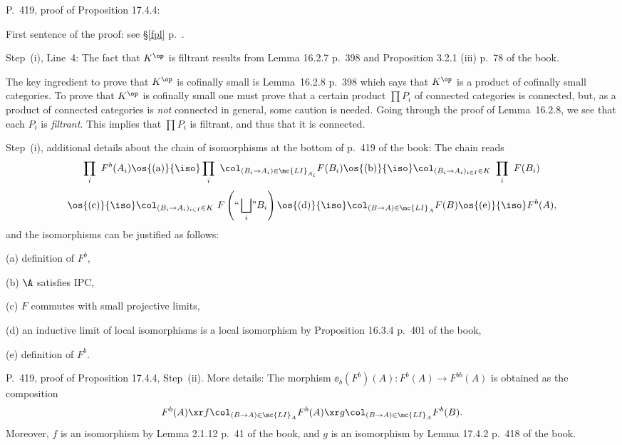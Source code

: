 \documentclass[12pt]{article}
\theoremstyle{remark}
\theoremstyle{definition}
\begin{document}
\begin{s}
P.~419, proof of Proposition 17.4.4: 

\nn First sentence of the proof: see \S\ref{fpl} p.~. 


\nn Step~(i), Line~4: The fact that $K^{\op}$ is filtrant results from Lemma 16.2.7 p.~398 and Proposition 3.2.1 (iii) p.~78 of the book. 

The key ingredient to prove that $K^{\op}$ is cofinally small is Lemma~16.2.8 p.~398 which says that $K^{\op}$ is a product of cofinally small categories. To prove that $K^{\op}$ is cofinally small one must prove that a certain product $\prod P_i$ of connected categories is connected, but, as a product of connected categories is \emph{not} connected in general, some caution is needed. Going through the proof of Lemma~16.2.8, we see that each $P_i$ is \emph{filtrant}. This implies that $\prod P_i$ is filtrant, and thus that it is connected.

\nn Step~(i), additional details about the chain of isomorphisms at the bottom of p.~419 of the book: The chain reads 
$$
\prod_i\ F^b(A_i)
\os{(\text a)}{\iso}\prod_i\ \col_{(B_i\to A_i)\in\mc{LI}_{A_i}}F(B_i)
\os{(\text b)}{\iso}\col_{(B_i\to A_i)_{i\in I}\in K}\ \prod_i\ F(B_i)
$$
$$
\os{(\text c)}{\iso}\col_{(B_i\to A_i)_{i\in I}\in K}\ F\left(``\bigsqcup_i\!"B_i\right)
\os{(\text d)}{\iso}\col_{(B\to A)\in\mc{LI}_A}F(B)
\os{(\text e)}{\iso}F^b(A), 
$$ 
and the isomorphisms can be justified as follows: 

\nn(a) definition of $F^b$, 

\nn(b) $\A$ satisfies IPC,

\nn(c) $F$ commutes with small projective limits, 

\nn(d) an inductive limit of local isomorphisms is a local isomorphism by Proposition 16.3.4 p.~401 of the book, 

\nn(e) definition of $F^b$. 
\end{s} 

%

\begin{s} 
P.~419, proof of Proposition 17.4.4, Step~(ii). More details: The morphism $\ee_b(F^b)(A):F^b(A)\to F^{bb}(A)$ is obtained as the composition 
$$
F^b(A)\xr f\col_{(B\to A)\in\mc{LI}_A}F^b(A)\xr g\col_{(B\to A)\in\mc{LI}_A}F^b(B). 
$$ 
Moreover, $f$ is an isomorphism by Lemma 2.1.12 p.~41 of the book, and $g$ is an isomorphism by Lemma 17.4.2 p.~418 of the book.
\end{s}
\end{document}
